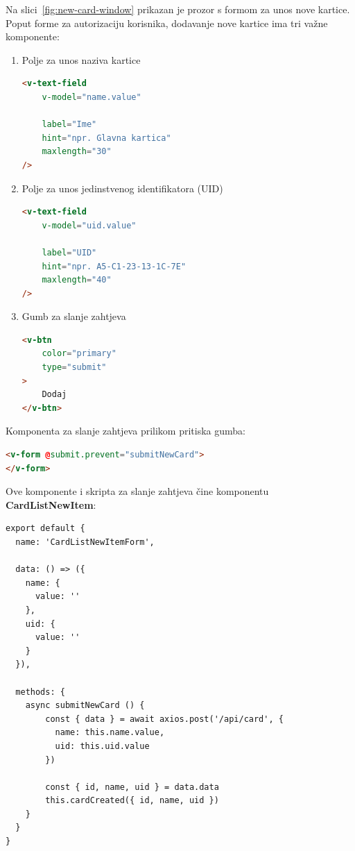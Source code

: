 Na slici~\ref{fig:new-card-window} prikazan je prozor s formom za unos nove kartice.
Poput forme za autorizaciju korisnika, dodavanje nove kartice ima tri važne komponente:

\begin{enumerate}
    \item Polje za unos naziva kartice
        \begin{lstlisting}[language=HTML]
<v-text-field
    v-model="name.value"

    label="Ime"
    hint="npr. Glavna kartica"
    maxlength="30"
/>
        \end{lstlisting}
    \item Polje za unos jedinstvenog identifikatora (UID)
        \begin{lstlisting}[language=HTML]
<v-text-field
    v-model="uid.value"

    label="UID"
    hint="npr. A5-C1-23-13-1C-7E"
    maxlength="40"
/>
        \end{lstlisting}
    \item Gumb za slanje zahtjeva
        \begin{lstlisting}[language=HTML]
<v-btn
    color="primary"
    type="submit"
>
    Dodaj
</v-btn>
        \end{lstlisting}
\end{enumerate}

Komponenta za slanje zahtjeva prilikom pritiska gumba:

\begin{lstlisting}[language=HTML]
<v-form @submit.prevent="submitNewCard">
</v-form>
\end{lstlisting}

Ove komponente i skripta za slanje zahtjeva čine komponentu \textbf{CardListNewItem}:

\begin{lstlisting}
export default {
  name: 'CardListNewItemForm',

  data: () => ({
    name: {
      value: ''
    },
    uid: {
      value: ''
    }
  }),

  methods: {
    async submitNewCard () {
        const { data } = await axios.post('/api/card', {
          name: this.name.value,
          uid: this.uid.value
        })

        const { id, name, uid } = data.data
        this.cardCreated({ id, name, uid })
    }
  }
}
\end{lstlisting}
